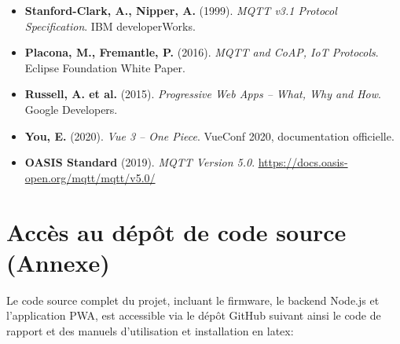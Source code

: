 \documentclass[12pt, a4paper]{report}
\begin{document}
\begin{itemize}[leftmargin=1.5cm, itemsep=5pt]
  \item \textbf{Stanford-Clark, A., Nipper, A.} (1999).
        \textit{MQTT v3.1 Protocol Specification}.
        IBM developerWorks.
  \item \textbf{Placona, M., Fremantle, P.} (2016).
        \textit{MQTT and CoAP, IoT Protocols}.
        Eclipse Foundation White Paper.
  \item \textbf{Russell, A. et al.} (2015).
        \textit{Progressive Web Apps -- What, Why and How}.
        Google Developers.
  \item \textbf{You, E.} (2020).
        \textit{Vue 3 -- One Piece}.
        VueConf 2020, documentation officielle.
  \item \textbf{OASIS Standard} (2019).
        \textit{MQTT Version 5.0}.
        \url{https://docs.oasis-open.org/mqtt/mqtt/v5.0/}
\end{itemize}

\section{Accès au dépôt de code source (Annexe)}
\begin{itemize}[leftmargin=1.5cm, itemsep=5pt]
Le code source complet du projet, incluant le firmware, le backend Node.js et l'application PWA, est accessible via le dépôt GitHub suivant ainsi le code de rapport et des manuels d'utilisation et installation en latex:
\\
\end{itemize}
\end{document}

